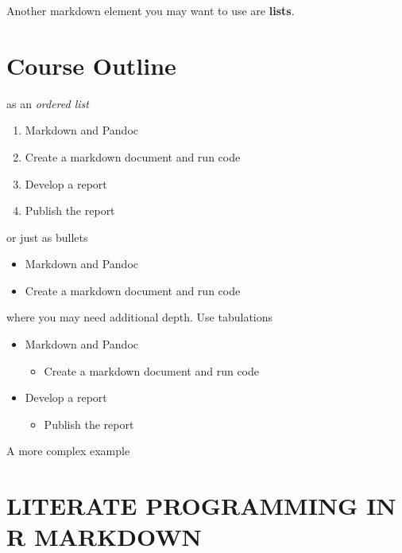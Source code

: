 \documentclass[
]{article}
\providecommand{\tightlist}{%
  \setlength{\itemsep}{0pt}\setlength{\parskip}{0pt}}
\begin{document}
Another markdown element you may want to use are \textbf{lists}.

\hypertarget{course-outline}{%
\section{Course Outline}\label{course-outline}}

as an \emph{ordered list}

\begin{enumerate}
\def\labelenumi{\arabic{enumi}.}
\tightlist
\item
  Markdown and Pandoc
\item
  Create a markdown document and run code
\item
  Develop a report
\item
  Publish the report
\end{enumerate}

or just as bullets

\begin{itemize}
\tightlist
\item
  Markdown and Pandoc
\item
  Create a markdown document and run code
\end{itemize}

where you may need additional depth. Use tabulations

\begin{itemize}
\tightlist
\item
  Markdown and Pandoc

  \begin{itemize}
  \tightlist
  \item
    Create a markdown document and run code
  \end{itemize}
\item
  Develop a report

  \begin{itemize}
  \tightlist
  \item
    Publish the report
  \end{itemize}
\end{itemize}

A more complex example

\hypertarget{literate-programming-in-r-markdown}{%
\section{LITERATE PROGRAMMING IN R
MARKDOWN}\label{literate-programming-in-r-markdown}}
\end{document}
